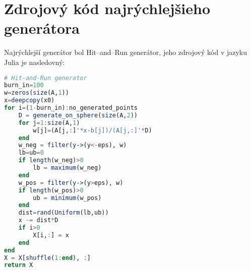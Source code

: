\chapter*{Zdrojový kód najrýchlejšieho generátora}

Najrýchlejší generátor bol Hit--and--Run generátor, jeho zdrojový kód v jazyku Julia je nasledovný:
\begin{lstlisting}[language=Julia]
# Hit-and-Run generator
burn_in=100
w=zeros(size(A,1))
x=deepcopy(x0)
for i=(1-burn_in):no_generated_points
    D = generate_on_sphere(size(A,2))
    for j=1:size(A,1)
        w[j]=(A[j,:]'*x-b[j])/(A[j,:]'*D)
    end
    w_neg = filter(y->(y<-eps), w)
    lb=ub=0
    if length(w_neg)>0
        lb = maximum(w_neg)
    end
    w_pos = filter(y->(y>eps), w)
    if length(w_pos)>0
        ub = minimum(w_pos)
    end
    dist=rand(Uniform(lb,ub))
    x -= dist*D
    if i>0
        X[i,:] = x
    end
end
X = X[shuffle(1:end), :]
return X
\end{lstlisting}
